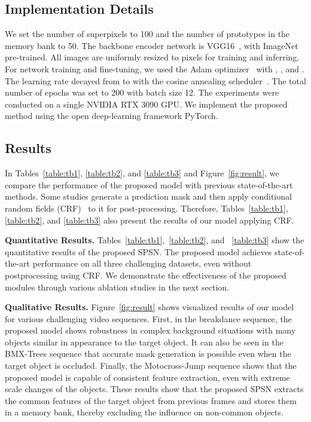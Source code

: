 \documentclass[10pt,twocolumn,letterpaper]{article}
\begin{document}
\subsection{Implementation Details}
We set the number of superpixels  to 100 and the number of prototypes  in the memory bank to 50. The backbone encoder network is VGG16~\cite{simonyan2014very}, with ImageNet~\cite{deng2009imagenet} pre-trained. All images are uniformly resized to  pixels for training and inferring. For network training and fine-tuning, we used the Adam optimizer~\cite{kingma2014adam} with , , and . The learning rate decayed from  to  with the cosine annealing scheduler~\cite{loshchilov2016sgdr}. The total number of epochs was set to 200 with batch size 12. The experiments were conducted on a single NVIDIA RTX 3090 GPU. We implement the proposed method using the open deep-learning framework PyTorch.

\subsection{Results}
In Tables~\ref{table:tb1}, \ref{table:tb2}, and \ref{table:tb3} and Figure~\ref{fig:result}, we compare the performance of the proposed model with previous state-of-the-art methods. Some studies generate a prediction mask and then apply conditional random fields (CRF)~\cite{lafferty2001conditional} to it for post-processing. Therefore, Tables~\ref{table:tb1}, \ref{table:tb2}, and \ref{table:tb3} also present the results of our model applying CRF.

\noindent
\textbf{Quantitative Results.} 
Tables~\ref{table:tb1},~\ref{table:tb2}, and ~\ref{table:tb3} show the quantitative results of the proposed SPSN. The proposed model achieves state-of-the-art performance on all three challenging datasets, even without postprocessing using CRF. We demonstrate the effectiveness of the proposed modules through various ablation studies in the next section.


\noindent
\textbf{Qualitative Results.} Figure~\ref{fig:result} shows visualized results of our model for various challenging video sequences. First, in the breakdance sequence, the proposed model shows robustness in complex background situations with many objects similar in appearance to the target object. It can also be seen in the BMX-Trees sequence that accurate mask generation is possible even when the target object is occluded. Finally, the Motocross-Jump sequence shows that the proposed model is capable of consistent feature extraction, even with extreme scale changes of the objects. These results show that the proposed SPSN extracts the common features of the target object from previous frames and stores them in a memory bank, thereby excluding the influence on non-common objects.
\end{document}
